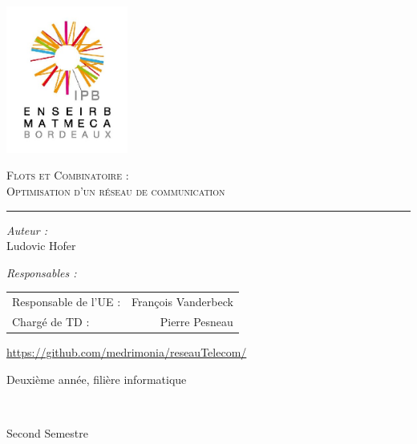 \documentclass[a4paper,12pt]{article}
\begin{document}
\begin{center}
  \includegraphics [width=40mm]{ENSEIRB-MATMECA.jpg}


\textsc{\Huge Flots et Combinatoire :}\\
\vspace{0.5cm}
\textsc{\Huge Optimisation d'un réseau de communication}\\
\rule{0.4\textwidth}{1pt}


\begin{center}
  
  \begin{flushleft}
    {\large
    \emph{Auteur :}}\\
    Ludovic Hofer
  \end{flushleft}
  
  
  \begin{flushright}
    {\large
    \emph{Responsables :}}\\
    \begin{tabular}{l r}
      Responsable de l'UE : & François Vanderbeck\\
      Chargé de TD : & Pierre Pesneau
    \end{tabular}
  \end{flushright}
\end{center}


{\large \url{https://github.com/medrimonia/reseauTelecom/}}

                  
{\large Deuxième année, filière informatique}

~

{\large Second Semestre}\\
                  
\end{center}
\thispagestyle{empty}
\pagebreak
\end{document}
